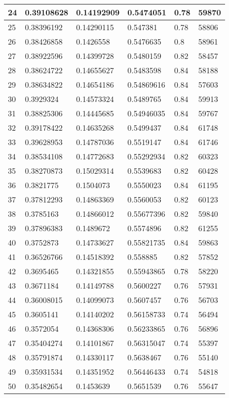\begin{longtable}{|l|l|l|l|l|l|}
24 & 0.39108628 & 0.14192909 & 0.5474051 & 0.78 & 59870 \\ \hline 
25 & 0.38396192 & 0.14290115 & 0.547381 & 0.78 & 58806 \\ \hline 
26 & 0.38426858 & 0.1426558 & 0.5476635 & 0.8 & 58961 \\ \hline 
27 & 0.38922596 & 0.14399728 & 0.5480159 & 0.82 & 58457 \\ \hline 
28 & 0.38624722 & 0.14655627 & 0.5483598 & 0.84 & 58188 \\ \hline 
29 & 0.38634822 & 0.14654186 & 0.54869616 & 0.84 & 57603 \\ \hline 
30 & 0.3929324 & 0.14573324 & 0.5489765 & 0.84 & 59913 \\ \hline 
31 & 0.38825306 & 0.14445685 & 0.54946035 & 0.84 & 59767 \\ \hline 
32 & 0.39178422 & 0.14635268 & 0.5499437 & 0.84 & 61748 \\ \hline 
33 & 0.39628953 & 0.14787036 & 0.5519147 & 0.84 & 61746 \\ \hline 
34 & 0.38534108 & 0.14772683 & 0.55292934 & 0.82 & 60323 \\ \hline 
35 & 0.38270873 & 0.15029314 & 0.5539683 & 0.82 & 60428 \\ \hline 
36 & 0.3821775 & 0.1504073 & 0.5550023 & 0.84 & 61195 \\ \hline 
37 & 0.37812293 & 0.14863369 & 0.5560053 & 0.82 & 60123 \\ \hline 
38 & 0.3785163 & 0.14866012 & 0.55677396 & 0.82 & 59840 \\ \hline 
39 & 0.37896383 & 0.1489672 & 0.5574896 & 0.82 & 61255 \\ \hline 
40 & 0.3752873 & 0.14733627 & 0.55821735 & 0.84 & 59863 \\ \hline 
41 & 0.36526766 & 0.14518392 & 0.558885 & 0.82 & 57852 \\ \hline 
42 & 0.3695465 & 0.14321855 & 0.55943865 & 0.78 & 58220 \\ \hline 
43 & 0.3671184 & 0.14149788 & 0.5600227 & 0.76 & 57931 \\ \hline 
44 & 0.36008015 & 0.14099073 & 0.5607457 & 0.76 & 56703 \\ \hline 
45 & 0.3605141 & 0.14140202 & 0.56158733 & 0.74 & 56494 \\ \hline 
46 & 0.3572054 & 0.14368306 & 0.56233865 & 0.76 & 56896 \\ \hline 
47 & 0.35404274 & 0.14101867 & 0.56315047 & 0.74 & 55397 \\ \hline 
48 & 0.35791874 & 0.14330117 & 0.5638467 & 0.76 & 55140 \\ \hline 
49 & 0.35931534 & 0.14351952 & 0.56446433 & 0.74 & 54818 \\ \hline 
50 & 0.35482654 & 0.1453639 & 0.5651539 & 0.76 & 55647 \\ \hline 
\end{longtable}